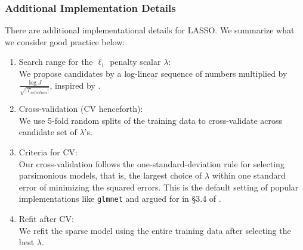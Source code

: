 \documentclass[11pt]{article}
\begin{document}
\subsubsection*{Additional Implementation Details}

There are additional implementational details for LASSO. We summarize what we consider good practice below:
\begin{enumerate}
	\item Search range for the $\ell_1$ penalty scalar $\lambda$: \\We propose candidates by a log-linear sequence of numbers multiplied by $
	\frac{\log J}{\sqrt{|T_{selection}|}}$, inspired by \cite{10.1214/17-AOS1630}.
	
	\item Cross-validation (CV henceforth): \\We use 5-fold random splits of the training data to cross-validate across candidate set of $\lambda$'s.
	
	\item Criteria for CV: \\Our cross-validation follows the one-standard-deviation rule for selecting parsimonious models, that is, the largest choice of $\lambda$ within one standard error of minimizing the squared errors. This is the default setting of popular implementations like \texttt{glmnet} and argued for in \S3.4 of \cite{hastie2009elements}.
	
	\item Refit after CV: \\We refit the sparse model using the entire training data after selecting the best $\lambda$.
\end{enumerate}





{\small
	
}
\end{document}
